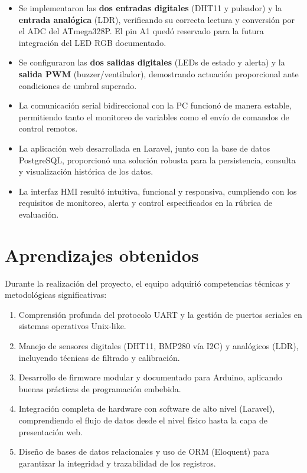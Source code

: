 \begin{itemize}[leftmargin=*]
    \item Se implementaron las \textbf{dos entradas digitales} (DHT11 y pulsador) y la \textbf{entrada analógica} (LDR), verificando su correcta lectura y conversión por el ADC del ATmega328P. El pin A1 quedó reservado para la futura integración del LED RGB documentado.
    \item Se configuraron las \textbf{dos salidas digitales} (LEDs de estado y alerta) y la \textbf{salida PWM} (buzzer/ventilador), demostrando actuación proporcional ante condiciones de umbral superado.
    \item La comunicación serial bidireccional con la PC funcionó de manera estable, permitiendo tanto el monitoreo de variables como el envío de comandos de control remotos.
    \item La aplicación web desarrollada en Laravel, junto con la base de datos PostgreSQL, proporcionó una solución robusta para la persistencia, consulta y visualización histórica de los datos.
    \item La interfaz HMI resultó intuitiva, funcional y responsiva, cumpliendo con los requisitos de monitoreo, alerta y control especificados en la rúbrica de evaluación.
\end{itemize}

\section{Aprendizajes obtenidos}

Durante la realización del proyecto, el equipo adquirió competencias técnicas y metodológicas significativas:

\begin{enumerate}[leftmargin=*]
    \item Comprensión profunda del protocolo UART y la gestión de puertos seriales en sistemas operativos Unix-like.
    \item Manejo de sensores digitales (DHT11, BMP280 vía I2C) y analógicos (LDR), incluyendo técnicas de filtrado y calibración.
    \item Desarrollo de firmware modular y documentado para Arduino, aplicando buenas prácticas de programación embebida.
    \item Integración completa de hardware con software de alto nivel (Laravel), comprendiendo el flujo de datos desde el nivel físico hasta la capa de presentación web.
    \item Diseño de bases de datos relacionales y uso de ORM (Eloquent) para garantizar la integridad y trazabilidad de los registros.
\end{enumerate}

